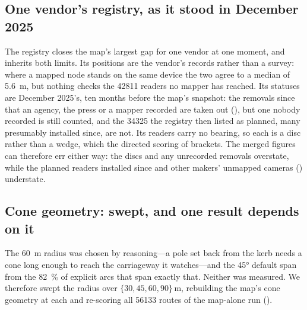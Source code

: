 \documentclass[11pt,twoside]{article}
\begin{document}
\subsection{One vendor's registry, as it stood in December 2025}
\label{sec:lim:registry}

The registry closes the map's largest gap for one vendor at one moment, and inherits both
limits. Its positions are the vendor's records rather than a survey: where a mapped node stands
on the same device the two agree to a median of \SI{5.6}{\metre}, but nothing checks the
\num{42811} readers no mapper has reached. Its statuses are December 2025's, ten months before
the map's snapshot: the removals since that an agency, the press or a mapper recorded are taken
out (), but one nobody recorded is still counted, and the \num{34325}
the registry then listed as planned, many presumably installed since, are not. Its readers
carry no bearing, so each is a disc rather than a wedge, which the directed scoring of
 brackets. The merged figures can therefore err either way: the
discs and any unrecorded removals overstate, while the planned readers installed since and
other makers' unmapped cameras () understate.

\subsection{Cone geometry: swept, and one result depends on it}
\label{sec:lim:geom}

The \SI{60}{\metre} radius was chosen by reasoning---a pole set back from the kerb needs a
cone long enough to reach the carriageway it watches---and the \ang{45} default span from
the \SI{82}{\percent} of explicit arcs that span exactly that. Neither was measured. We
therefore swept the radius over $\{30, 45, 60, 90\}\,\si{\metre}$, rebuilding the map's cone
geometry at each and re-scoring all \num{56133} routes of the map-alone run
().
\end{document}
